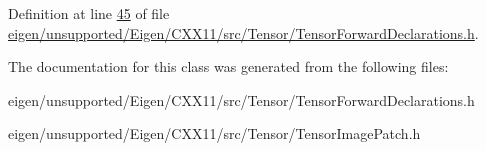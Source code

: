 Definition at line \hyperlink{eigen_2unsupported_2_eigen_2_c_x_x11_2src_2_tensor_2_tensor_forward_declarations_8h_source_l00045}{45} of file \hyperlink{eigen_2unsupported_2_eigen_2_c_x_x11_2src_2_tensor_2_tensor_forward_declarations_8h_source}{eigen/unsupported/\+Eigen/\+C\+X\+X11/src/\+Tensor/\+Tensor\+Forward\+Declarations.\+h}.



The documentation for this class was generated from the following files\+:\begin{DoxyCompactItemize}
\item 
eigen/unsupported/\+Eigen/\+C\+X\+X11/src/\+Tensor/\+Tensor\+Forward\+Declarations.\+h\item 
eigen/unsupported/\+Eigen/\+C\+X\+X11/src/\+Tensor/\+Tensor\+Image\+Patch.\+h\end{DoxyCompactItemize}
